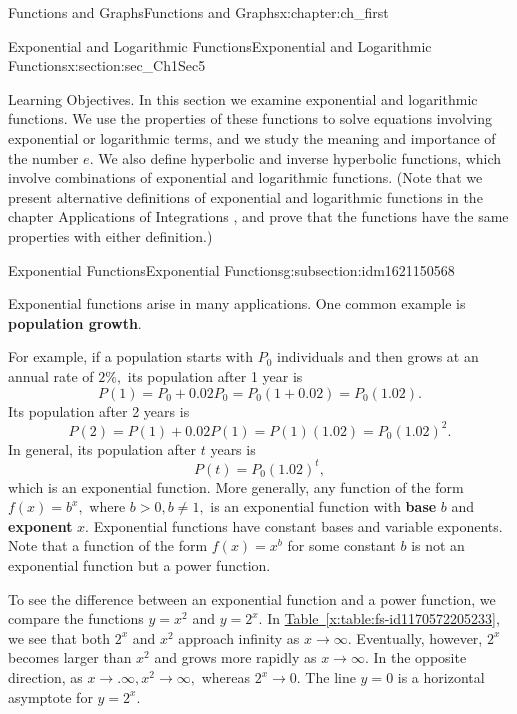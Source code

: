\documentclass[oneside,10pt,]{book}
\newcommand{\xreffont}{\relax}
\newcommand{\terminology}[1]{\textbf{#1}}
\numberwithin{equation}{section}
\newcommand{\gt}{>}
\begin{document}
\begin{chapterptx}{Functions and Graphs}{}{Functions and Graphs}{}{}{x:chapter:ch_first}
\begin{sectionptx}{Exponential and Logarithmic Functions}{}{Exponential and Logarithmic Functions}{}{}{x:section:sec_Ch1Sec5}
\begin{introduction}{Learning Objectives.}
In this section we examine exponential and logarithmic functions. We use the properties of these functions to solve equations involving exponential or logarithmic terms, and we study the meaning and importance of the number \(e.\) We also define hyperbolic and inverse hyperbolic functions, which involve combinations of exponential and logarithmic functions. (Note that we present alternative definitions of exponential and logarithmic functions in the chapter  Applications of Integrations , and prove that the functions have the same properties with either definition.)%
\end{introduction}%
%
%
\typeout{************************************************}
\typeout{************************************************}
%
\begin{subsectionptx}{Exponential Functions}{}{Exponential Functions}{}{}{g:subsection:idm1621150568}
\begin{introduction}{}%
Exponential functions arise in many applications. One common example is \terminology{population growth}.%
\par
For example, if a population starts with \(P_0\) individuals and then grows at an annual rate of \(2\%,\) its population after 1 year is%
%
\begin{equation*}
P(1)=P_0+0.02P_0=P_0(1+0.02)=P_0(1.02).
\end{equation*}
Its population after 2 years is%
%
\begin{equation*}
P(2)=P(1)+0.02P(1)=P(1)(1.02)=P_0(1.02)^2.
\end{equation*}
In general, its population after \(t\) years is%
%
\begin{equation*}
P(t)=P_0(1.02)^t,
\end{equation*}
which is an exponential function. More generally, any function of the form \(f(x)=b^x,\) where \(b\gt 0,b\neq 1,\) is an exponential function with \terminology{base} \(b\) and \terminology{exponent} \(x\). Exponential functions have constant bases and variable exponents. Note that a function of the form \(f(x)=x^b\) for some constant \(b\) is not an exponential function but a power function.%
\par
To see the difference between an exponential function and a power function, we compare the functions \(y=x^2\) and \(y=2^x.\) In \hyperref[x:table:fs-id1170572205233]{Table~{\xreffont\ref{x:table:fs-id1170572205233}}}, we see that both \(2^x\) and \(x^2\) approach infinity as \(x\to \infty.\) Eventually, however, \(2^x\) becomes larger than \(x^2\) and grows more rapidly as \(x\to \infty.\) In the opposite direction, as \(x\to .\infty,x^2\to \infty,\) whereas \(2^x\to 0.\) The line \(y=0\) is a horizontal asymptote for \(y=2^x.\)%

\end{introduction}
\end{subsectionptx}
\end{sectionptx}
\end{chapterptx}
\end{document}
